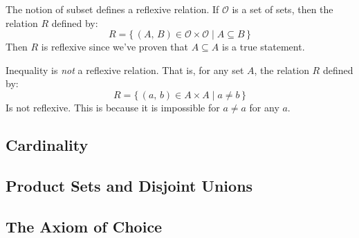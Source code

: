             \begin{example}
                The notion of subset defines a reflexive relation. If
                $\mathcal{O}$ is a set of sets, then the relation $R$ defined
                by:
                \begin{equation}
                    R=\{\,(A,\,B)\in\mathcal{O}\times\mathcal{O}\;|\;
                        A\subseteq{B}\,\}
                \end{equation}
                Then $R$ is reflexive since we've proven that $A\subseteq{A}$
                is a true statement.
            \end{example}
            \begin{example}
                Inequality is \textit{not} a reflexive relation. That is,
                for any set $A$, the relation $R$ defined by:
                \begin{equation}
                    R=\{\,(a,\,b)\in{A}\times{A}\;|\;a\ne{b}\,\}
                \end{equation}
                Is not reflexive. This is because it is impossible for
                $a\ne{a}$ for any $a$.
            \end{example}
        \subsection{Cardinality}
        \subsection{Product Sets and Disjoint Unions}
        \subsection{The Axiom of Choice}
